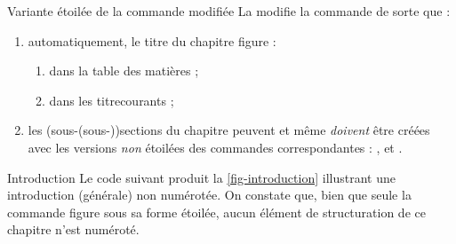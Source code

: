 
\begin{dbremark}{Variante étoilée de la commande \protect{} modifiée}{}
  La \yatcl{} modifie la commande  de sorte que :
  \begin{enumerate}
  \item automatiquement, le titre du chapitre figure :
    \begin{enumerate}
    \item dans la table des matières ;
    \item dans les \glspl{titrecourant} ;
    \end{enumerate}
  \item les (sous-(sous-))sections du chapitre peuvent et même \emph{doivent}
    être créées avec les versions \emph{non} étoilées des commandes
    correspondantes : ,  et
    .
  \end{enumerate}
\end{dbremark}

\begin{dbexample}{Introduction}{}
  Le code suivant produit la \vref{fig-introduction} illustrant une
  introduction (générale) non numérotée. On constate que, bien que seule la
  commande  figure sous sa forme étoilée, aucun élément
  de structuration de ce chapitre n'est numéroté.
\end{dbexample}

